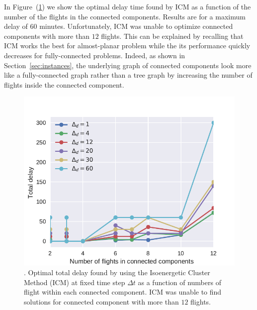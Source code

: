 In Figure~(\ref{fig:icm2}) we show the optimal delay time found by ICM as a
function of the number of the flights in the connected components. Results are
for a maximum delay of 60 minutes. Unfortunately, ICM was unable to optimize
connected components with more than $12$ flights. This can be explained by
recalling that ICM works the best for almost-planar problem while the
its performance quickly decreases for fully-connected problems. Indeed, as shown
in Section~\ref{sec:instances}, the underlying graph of connected components
look more like a fully-connected graph rather than a tree graph by increasing
the number of flights inside the connected component.

\begin{figure}
  \includegraphics[width=\columnwidth]{pics/qubo_icm/qubo_icm_2.pdf}
  \caption{\label{fig:icm2}. Optimal total delay found by using the Isoenergetic
  Cluster Method (ICM) at fixed time step $\Delta t$ as a function of numbers of
  flight within each connected component. ICM was unable to find solutions for connected
  component with more than $12$ flights.}
\end{figure}
